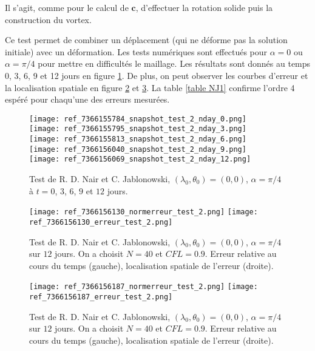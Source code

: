 Il s'agit, comme pour le calcul de $\mathbf{c}$, d'effectuer la rotation solide puis la construction du vortex.

Ce test permet de combiner un déplacement (qui ne déforme pas la solution initiale) avec un déformation. Les tests numériques sont effectués pour $\alpha = 0$ ou $\alpha = \pi/4$ pour mettre en difficultés le maillage. Les résultats sont donnés au temps 0, 3, 6, 9 et 12 jours en figure \ref{fig NJ1}. De plus, on peut observer les courbes d'erreur et la localisation spatiale en figure \ref{fig NJ2} et \ref{fig NJ3}. La table \ref{table NJ1} confirme l'ordre 4 espéré pour chaqu'une des erreurs mesurées.

\begin{figure}[ht]
\begin{center}
\texttt{[image: ref\_7366155784\_snapshot\_test\_2\_nday\_0.png]}\\
\texttt{[image: ref\_7366155795\_snapshot\_test\_2\_nday\_3.png]}\\
\texttt{[image: ref\_7366155813\_snapshot\_test\_2\_nday\_6.png]}\\
\texttt{[image: ref\_7366156040\_snapshot\_test\_2\_nday\_9.png]}\\
\texttt{[image: ref\_7366156069\_snapshot\_test\_2\_nday\_12.png]}\\
\caption{Test de R. D. Nair et C. Jablonowski, $(\lambda_0, \theta_0) = (0,0)$, $\alpha= \pi/4$ à $t=0$, $3$, $6$, $9$ et $12$ jours.}
\label{fig NJ1}
\end{center}
\end{figure}

\begin{figure}[ht]
\begin{center}
\texttt{[image: ref\_7366156130\_normerreur\_test\_2.png]}
\texttt{[image: ref\_7366156130\_erreur\_test\_2.png]}
\caption{Test de R. D. Nair et C. Jablonowski, $(\lambda_0, \theta_0) = (0,0)$, $\alpha= \pi/4$ sur $12$ jours. On a choisit $N=40$ et $CFL=0.9$. Erreur relative au cours du temps (gauche), localisation spatiale de l'erreur (droite).}
\label{fig NJ2}
\end{center}
\end{figure}

\begin{figure}[ht]
\begin{center}
\texttt{[image: ref\_7366156187\_normerreur\_test\_2.png]}
\texttt{[image: ref\_7366156187\_erreur\_test\_2.png]}
\caption{Test de R. D. Nair et C. Jablonowski, $(\lambda_0, \theta_0) = (0,0)$, $\alpha= \pi/4$ sur $12$ jours. On a choisit $N=40$ et $CFL=0.9$. Erreur relative au cours du temps (gauche), localisation spatiale de l'erreur (droite).}
\label{fig NJ3}
\end{center}
\end{figure}

